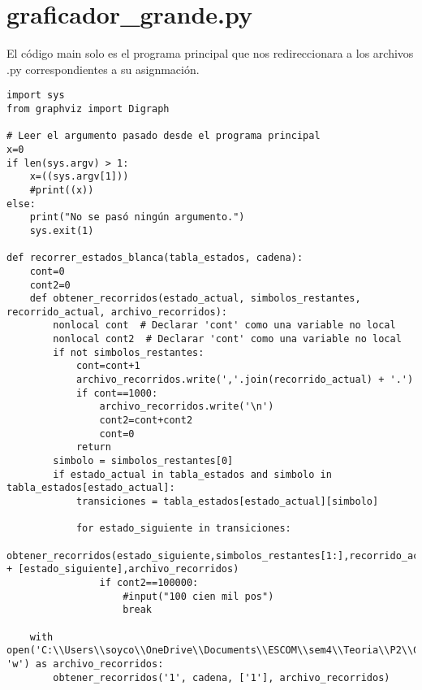 \section{graficador_grande.py}
El código main solo es el programa principal que nos redireccionara a los archivos .py correspondientes a su asignmación. \newline
\\
\begin{lstlisting}
import sys
from graphviz import Digraph

# Leer el argumento pasado desde el programa principal
x=0
if len(sys.argv) > 1:
    x=((sys.argv[1]))
    #print((x))
else:
    print("No se pasó ningún argumento.")
    sys.exit(1)

def recorrer_estados_blanca(tabla_estados, cadena):
    cont=0
    cont2=0
    def obtener_recorridos(estado_actual, simbolos_restantes, recorrido_actual, archivo_recorridos):
        nonlocal cont  # Declarar 'cont' como una variable no local
        nonlocal cont2  # Declarar 'cont' como una variable no local
        if not simbolos_restantes:
            cont=cont+1
            archivo_recorridos.write(','.join(recorrido_actual) + '.')
            if cont==1000:
                archivo_recorridos.write('\n')
                cont2=cont+cont2
                cont=0
            return
        simbolo = simbolos_restantes[0]
        if estado_actual in tabla_estados and simbolo in tabla_estados[estado_actual]:
            transiciones = tabla_estados[estado_actual][simbolo]

            for estado_siguiente in transiciones:
                obtener_recorridos(estado_siguiente,simbolos_restantes[1:],recorrido_actual + [estado_siguiente],archivo_recorridos)
                if cont2==100000:
                    #input("100 cien mil pos")
                    break

    with open('C:\\Users\\soyco\\OneDrive\\Documents\\ESCOM\\sem4\\Teoria\\P2\\Chess\\output\\recorridos_blanca.txt', 'w') as archivo_recorridos:
        obtener_recorridos('1', cadena, ['1'], archivo_recorridos)


\end{lstlisting}
